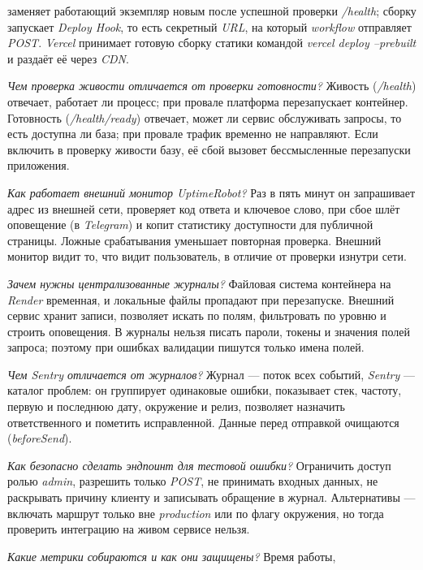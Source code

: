 \documentclass{stp}
\newcommand{\en}[1]{\textit{#1}}
\begin{document}
\begin{stpnum}
    заменяет работающий экземпляр новым после успешной проверки
    \en{/health}; сборку запускает \en{Deploy Hook}, то есть секретный
    \en{URL}, на который \en{workflow} отправляет \en{POST}. \en{Vercel}
    принимает готовую сборку статики командой \en{vercel deploy --prebuilt}
    и раздаёт её через \en{CDN}.
  \item \textit{Чем проверка живости отличается от проверки готовности?}
    Живость (\en{/health}) отвечает, работает ли процесс; при провале
    платформа перезапускает контейнер. Готовность (\en{/health/ready})
    отвечает, может ли сервис обслуживать запросы, то есть доступна ли база;
    при провале трафик временно не направляют. Если включить в проверку
    живости базу, её сбой вызовет бессмысленные перезапуски приложения.
  \item \textit{Как работает внешний монитор \en{UptimeRobot}?} Раз в пять
    минут он запрашивает адрес из внешней сети, проверяет код ответа и
    ключевое слово, при сбое шлёт оповещение (в \en{Telegram}) и копит
    статистику доступности для публичной страницы. Ложные срабатывания
    уменьшает повторная проверка. Внешний монитор видит то, что видит
    пользователь, в отличие от проверки изнутри сети.
  \item \textit{Зачем нужны централизованные журналы?} Файловая система
    контейнера на \en{Render} временная, и локальные файлы пропадают при
    перезапуске. Внешний сервис хранит записи, позволяет искать по полям,
    фильтровать по уровню и строить оповещения. В журналы нельзя писать
    пароли, токены и значения полей запроса; поэтому при ошибках валидации
    пишутся только имена полей.
  \item \textit{Чем \en{Sentry} отличается от журналов?} Журнал --- поток
    всех событий, \en{Sentry} --- каталог проблем: он группирует одинаковые
    ошибки, показывает стек, частоту, первую и последнюю дату, окружение и
    релиз, позволяет назначить ответственного и пометить исправленной.
    Данные перед отправкой очищаются (\en{beforeSend}).
  \item \textit{Как безопасно сделать эндпоинт для тестовой ошибки?}
    Ограничить доступ ролью \en{admin}, разрешить только \en{POST}, не
    принимать входных данных, не раскрывать причину клиенту и записывать
    обращение в журнал. Альтернативы --- включать маршрут только вне
    \en{production} или по флагу окружения, но тогда проверить интеграцию
    на живом сервисе нельзя.
  \item \textit{Какие метрики собираются и как они защищены?} Время работы,

\end{stpnum}
\end{document}
